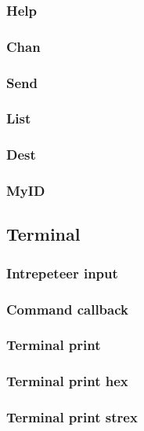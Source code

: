     \subsubsection{Help}
    \subsubsection{Chan}
    \subsubsection{Send}
    \subsubsection{List}
    \subsubsection{Dest}
    \subsubsection{MyID}

\subsection{Terminal}
    \subsubsection{Intrepeteer input}
    \subsubsection{Command callback}
    \subsubsection{Terminal print}
    \subsubsection{Terminal print hex}
    \subsubsection{Terminal print strex}

